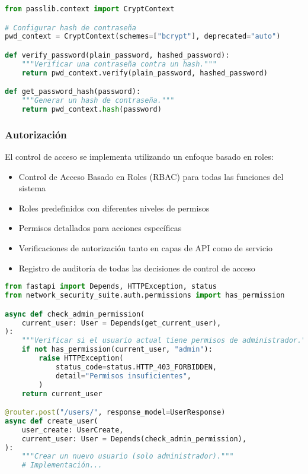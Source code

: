 \begin{lstlisting}[language=python, caption=Ejemplo de Hash de Contraseña]
from passlib.context import CryptContext

# Configurar hash de contraseña
pwd_context = CryptContext(schemes=["bcrypt"], deprecated="auto")

def verify_password(plain_password, hashed_password):
    """Verificar una contraseña contra un hash."""
    return pwd_context.verify(plain_password, hashed_password)

def get_password_hash(password):
    """Generar un hash de contraseña."""
    return pwd_context.hash(password)
\end{lstlisting}

\subsubsection{Autorización}
El control de acceso se implementa utilizando un enfoque basado en roles:

\begin{itemize}
    \item Control de Acceso Basado en Roles (RBAC) para todas las funciones del sistema
    \item Roles predefinidos con diferentes niveles de permisos
    \item Permisos detallados para acciones específicas
    \item Verificaciones de autorización tanto en capas de API como de servicio
    \item Registro de auditoría de todas las decisiones de control de acceso
\end{itemize}

\begin{lstlisting}[language=python, caption=Ejemplo de Verificación de Autorización]
from fastapi import Depends, HTTPException, status
from network_security_suite.auth.permissions import has_permission

async def check_admin_permission(
    current_user: User = Depends(get_current_user),
):
    """Verificar si el usuario actual tiene permisos de administrador."""
    if not has_permission(current_user, "admin"):
        raise HTTPException(
            status_code=status.HTTP_403_FORBIDDEN,
            detail="Permisos insuficientes",
        )
    return current_user

@router.post("/users/", response_model=UserResponse)
async def create_user(
    user_create: UserCreate,
    current_user: User = Depends(check_admin_permission),
):
    """Crear un nuevo usuario (solo administrador)."""
    # Implementación...
\end{lstlisting}

